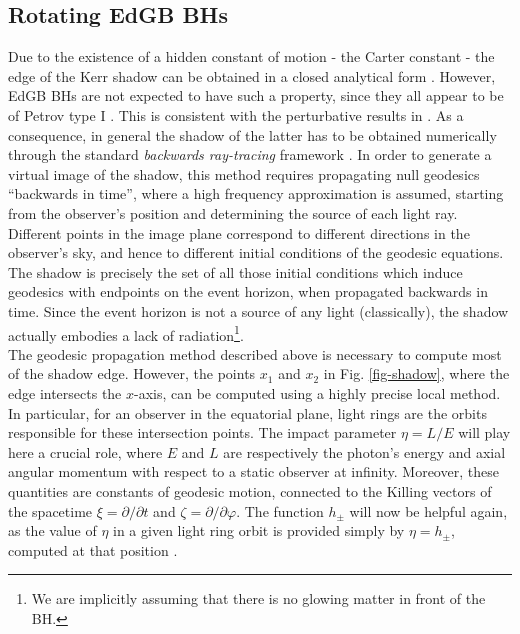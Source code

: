 \documentclass[12pt]{article}
\begin{document}
\subsection{Rotating EdGB BHs}

Due to the existence of a hidden constant of motion - the Carter constant - the edge of the Kerr shadow can be obtained in a closed analytical form \cite{Bardeen:1973tla,Grenzebach:2014fha,Cunha:2016bpi}. However, EdGB BHs are not expected to have such a property, since they all appear to be of Petrov type I \cite{Kleihaus:2015aje}. This is consistent with the perturbative results in \cite{Ayzenberg:2014aka}. As a consequence, in general the shadow of the latter has to be obtained numerically through the standard \textit{backwards ray-tracing} framework \cite{Johannsen:2015qca,Psaltis:2010ww}. In order to generate a virtual image of the shadow, this method requires propagating null geodesics ``backwards in time'', where a high frequency approximation is assumed, starting from the observer's position and determining the source of each light ray. Different points in the image plane correspond to different directions in the observer's sky, and hence to different initial conditions of the geodesic equations. The shadow is precisely the set of all those initial conditions which induce geodesics with endpoints on the event horizon, when propagated backwards in time. Since the event horizon is not a source of any light (classically), the shadow actually embodies a lack of radiation\footnote{We are implicitly assuming that there is no glowing matter in front of the BH.}.\\

The geodesic propagation method described above is necessary to compute most of the shadow edge. However, the points $x_1$ and $x_2$ in Fig. \ref{fig-shadow}, where the edge intersects the $x$-axis, can be computed using a highly precise local method. In particular, for an observer in the equatorial plane, light rings are the orbits responsible for these intersection points. The impact parameter $\eta=L/E$ will play here a crucial role, where $E$ and $L$ are respectively the photon's energy and axial angular momentum with respect to a static observer at infinity. Moreover, these quantities are constants of geodesic motion, connected to the Killing vectors of the spacetime $\xi=\partial/\partial t$ and $\zeta=\partial/\partial \varphi$.
The function $h_\pm$ will now be helpful again, as the value of $\eta$ in a given light ring orbit is provided simply by $\eta=h_\pm$, computed at that position \cite{Cunha:2016bjh}.
\end{document}
